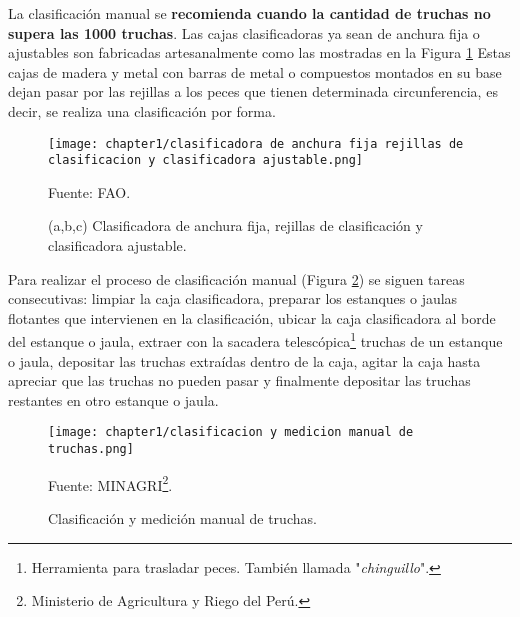 La clasificación manual se \textbf{recomienda cuando la cantidad de truchas no supera las 1000 truchas}.\citep[p.~25]{FAO2014} Las cajas clasificadoras ya sean de anchura fija o ajustables son fabricadas artesanalmente como las mostradas en la Figura \ref{fig:clasificadora de anchura fija rejillas de clasificacion y clasificadora ajustable} Estas cajas de madera y metal con barras de metal o compuestos montados en su base dejan pasar por las rejillas a los peces que tienen determinada circunferencia, es decir, se realiza una clasificación por forma.\citep[p.~15]{FAO2005}

\begin{figure}[H]
	\centering
	\texttt{[image: chapter1/clasificadora de anchura fija rejillas de clasificacion y clasificadora ajustable.png]}
	\caption{(a,b,c) Clasificadora de anchura fija, rejillas de clasificación y clasificadora ajustable.}
	\begin{myflushleftportland}
		Fuente: FAO.
	\end{myflushleftportland}	
	\label{fig:clasificadora de anchura fija rejillas de clasificacion y clasificadora ajustable}
\end{figure}

Para realizar el proceso de clasificación manual (Figura \ref{fig:clasificacion y medicion manual de truchas}) se siguen tareas consecutivas: limpiar la caja clasificadora, preparar los estanques o jaulas flotantes que intervienen en la clasificación, ubicar la caja clasificadora al borde del estanque o jaula, extraer con la sacadera telescópica\footnote{Herramienta para trasladar peces. También llamada "\textit{chinguillo}".} truchas de un estanque o jaula, depositar las truchas extraídas dentro de la caja, agitar la caja hasta apreciar que las truchas no pueden pasar y finalmente depositar las truchas restantes en otro estanque o jaula.\\

\begin{savenotes}
	\begin{figure}[H]
		\centering
		\texttt{[image: chapter1/clasificacion y medicion manual de truchas.png]}
		\caption{Clasificación y medición manual de truchas.}
		\begin{myflushleftportland}
			Fuente: MINAGRI\footnote{Ministerio de Agricultura y Riego del Perú.}.
		\end{myflushleftportland}			
		\label{fig:clasificacion y medicion manual de truchas}
	\end{figure}
\end{savenotes}

